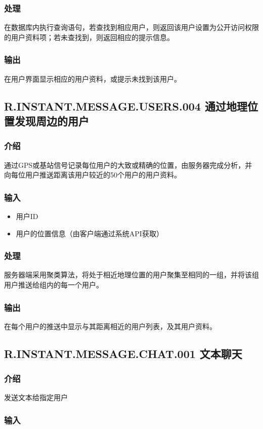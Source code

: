\subsubsection{处理}
在数据库内执行查询语句，若查找到相应用户，则返回该用户设置为公开访问权限的用户资料项；若未查找到，则返回相应的提示信息。
\subsubsection{输出}
在用户界面显示相应的用户资料，或提示未找到该用户。

\subsection{R.INSTANT.MESSAGE.USERS.004 通过地理位置发现周边的用户}
\subsubsection{介绍}
通过GPS或基站信号记录每位用户的大致或精确的位置，由服务器完成分析，并向每位用户推送距离该用户较近的50个用户的用户资料。
\subsubsection{输入}
\begin{itemize}
	\item 用户ID
	\item 用户的位置信息（由客户端通过系统API获取）
\end{itemize}
\subsubsection{处理}
服务器端采用聚类算法，将处于相近地理位置的用户聚集至相同的一组，并将该组用户推送给组内的每一个用户。
\subsubsection{输出}
在每个用户的推送中显示与其距离相近的用户列表，及其用户资料。
\subsection{R.INSTANT.MESSAGE.CHAT.001 文本聊天}
\subsubsection{介绍}

发送文本给指定用户

\subsubsection{输入}


